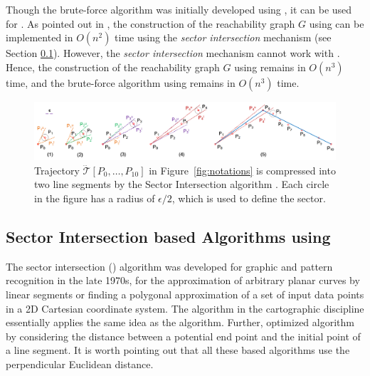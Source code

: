 %
Though the brute-force algorithm was initially developed using \ped, it can be used for \sed.
As pointed out in \cite{Chan:Optimal}, the construction of the reachability graph $G$ using \ped can be implemented in $O(n^2)$ time using the \textit{sector intersection} mechanism (see Section \ref{sub-ci-ped}). However, the \textit{sector intersection} mechanism cannot work with \sed.  Hence, the construction of the reachability graph $G$ using \sed remains in $O(n^3)$ time, and the brute-force algorithm using \sed remains in  $O(n^3)$ time.


\begin{figure}[tb!]
	\centering
	\includegraphics[scale=0.78]{figures/Fig-sleeve.png}
	\caption{\small Trajectory $\dddot{\mathcal{T}}[P_0, \ldots, P_{10}]$ in Figure~\ref{fig:notations} is compressed into two line segments by the Sector Intersection algorithm  \cite{Williams:Longest, Sklansky:Cone}. Each circle in the figure has a radius of $\epsilon/2$, which is used to define the sector. }
	\vspace{-1ex}
	\label{fig:sleeve}
\end{figure}


\subsection{Sector Intersection based Algorithms using \ped}
\label{sub-ci-ped}





The sector intersection (\cia) algorithm \cite{Williams:Longest, Sklansky:Cone} was developed for graphic and pattern recognition in the late 1970s, for the approximation of arbitrary planar curves by linear segments or finding a polygonal approximation of a set of input data points in a 2D Cartesian coordinate system. The \sleeve algorithm \cite{Zhao:Sleeve} in the cartographic discipline essentially applies the same idea as the \cia algorithm.
Further, \cite{Dunham:Cone}  optimized algorithm \cia by considering the distance between a potential end point and the initial point of a line segment. It is worth pointing out that all these \cia based algorithms use the perpendicular Euclidean distance.

